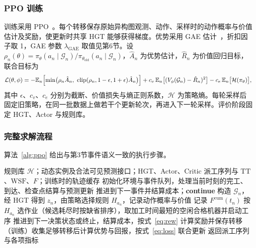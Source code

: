 \documentclass[12pt,a4paper]{article}
\newcommand{\cJ}{\mathcal{J}}
\newcommand{\cH}{\mathcal{H}}
\newcommand{\cG}{\mathcal{G}}
\newcommand{\cum}{\mathrm{cum}}
\begin{document}
\subsubsection{PPO 训练}

训练采用 PPO~\cite{schulman2017ppo}。每个转移保存原始异构图观测、动作、采样时的动作概率与价值估计及奖励，使更新时共享 HGT 能够获得梯度。优势采用 GAE 估计~\cite{schulman2016gae}，折扣因子取 1，GAE 参数 $\lambda_{\mathrm{GAE}}$ 取值见第6节。设 $\rho_n(\theta)=\pi_\theta(a_n\mid\cG_n)/\pi_{\theta_{\mathrm{old}}}(a_n\mid\cG_n)$，$\hat A_n$ 为优势估计，$\hat R_n$ 为价值回归目标，联合目标为
\begin{equation}\label{eq:loss}
  \mathcal{L}(\theta,\phi)=-\mathbb{E}_n\Bigl[\min\bigl(\rho_n\hat A_n,\ \mathrm{clip}(\rho_n,1-\epsilon,1+\epsilon)\hat A_n\bigr)\Bigr]
  +c_v\,\mathbb{E}_n\bigl[(V_\phi(\cG_n)-\hat R_n)^2\bigr]-c_e\,\mathbb{E}_n\bigl[\mathcal{H}(\pi_\theta)\bigr],
\end{equation}
其中 $\epsilon$、$c_v$、$c_e$ 分别为截断、价值损失与熵正则系数，$\mathcal{H}$ 为策略熵。每轮采样后固定旧策略，在同一批数据上做若干个更新轮次，再进入下一轮采样。评价阶段固定 HGT、Actor 与规则库。

\subsubsection{完整求解流程}

算法~\ref{alg:ppo} 给出与第3节事件语义一致的执行步骤。

\begin{algorithm}[t]
  \caption{HGT--PPO 事件驱动批量派工与训练}\label{alg:ppo}
  \begin{algorithmic}[1]
    \Require 规则库 $\cH$；动态实例及合法可见预测接口；HGT、Actor、Critic
    \Ensure 派工序列与 $\mathrm{TT}$、$\mathrm{WSF}$、$F$；训练时的轨迹缓存
    \State 初始化环境与事件队列，处理当前时刻的完工、到达、检查点结算与预测更新
      \If{$\cJ^{\mathrm{feas}}_n=\emptyset$}
        \State 推进到下一事件并结算成本；\textbf{continue}
      \EndIf
      \State 构造 $\cG_n$，经 HGT 得到 $z_n$，由策略选择规则 $H_{a_n}$，记录动作概率与价值
      \State 记录 $F^{\cum}(t_n)$
        \State 按 $H_{a_n}$ 选作业（候选耗尽时按缺省排序），取加工时间最短的空闲合格机器并启动工序
      \EndWhile
      \State 推进到下一决策状态或终止，结算成本，按式~\eqref{eq:rew} 计算奖励并保存转移
      \State （训练）收集足够转移后计算优势与回报，按式~\eqref{eq:loss} 联合更新
    \EndWhile
    \State 返回派工序列与各项指标
  \end{algorithmic}
\end{algorithm}
\end{document}
